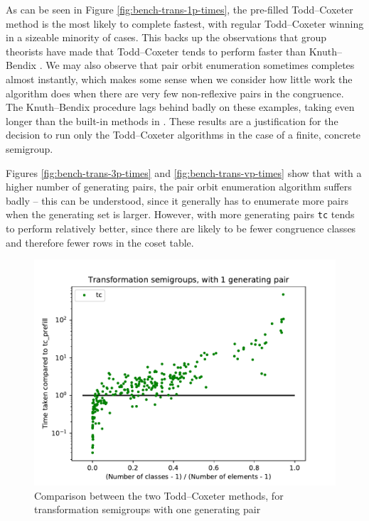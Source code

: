 As can be seen in Figure \ref{fig:bench-trans-1p-times}, the pre-filled
Todd--Coxeter method is the most likely to complete fastest, with regular
Todd--Coxeter winning in a sizeable minority of cases.  This backs up the
observations that group theorists have made that Todd--Coxeter tends to perform
faster than Knuth--Bendix \cite{havascomparing}.  We may also observe that pair
orbit enumeration sometimes completes almost instantly, which makes some sense
when we consider how little work the algorithm does when there are very few
non-reflexive pairs in the congruence.  The Knuth--Bendix procedure lags behind
badly on these examples, taking even longer than the built-in methods in \GAP{}.
These results are a justification for the decision to run only the Todd--Coxeter
algorithms in the case of a finite, concrete semigroup.

Figures \ref{fig:bench-trans-3p-times} and \ref{fig:bench-trans-vp-times} show
that with a higher number of generating pairs, the pair orbit enumeration
algorithm suffers badly -- this can be understood, since it generally has to
enumerate more pairs when the generating set is larger.  However, with more
generating pairs \texttt{tc} tends to perform relatively better, since there are
likely to be fewer congruence classes and therefore fewer rows in the coset
table.

\begin{figure}[p]
  \centering
  \includegraphics[width=\textwidth]{pics/ch-pairs/bench-trans-tc-1p-tccomp}
  \caption[Benchmark: Todd--Coxeter, concrete, 1 pair]
  {Comparison between the two Todd--Coxeter methods, for transformation
    semigroups with one generating pair}
  \label{fig:bench-trans-tc-1p-tccomp}
\end{figure}

